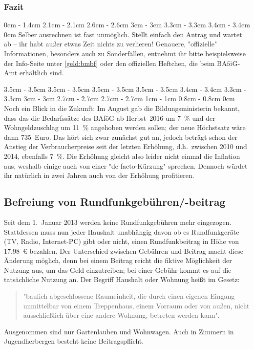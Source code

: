 \begin{multicols*}{2}
\subsubsection*{Fazit}
0cm \columnwidth
0cm \columnwidth
1.4cm \dimexpr\columnwidth - 1.4cm
2.1cm \dimexpr\columnwidth - 2.1cm
2.6cm \dimexpr\columnwidth - 2.6cm
3cm \dimexpr\columnwidth - 3cm
3.3cm \dimexpr\columnwidth - 3.3cm
3.4cm \dimexpr\columnwidth - 3.4cm
0cm \columnwidth
Selber ausrechnen ist fast unmöglich. Stellt einfach den Antrag und wartet ab -- ihr habt außer etwas Zeit nichts zu verlieren! Genauere, "offizielle" Informationen, besonders auch zu Sonderfällen, entnehmt ihr bitte beispielsweise der Info-Seite unter \cref{geld:bmbf} oder den offiziellen Heftchen, die beim BAföG-Amt erhältlich sind.


3.5cm \dimexpr\columnwidth - 3.5cm
3.5cm \dimexpr\columnwidth - 3.5cm
3.5cm \dimexpr\columnwidth - 3.5cm
3.5cm \dimexpr\columnwidth - 3.5cm
3.4cm \dimexpr\columnwidth - 3.4cm
3.3cm \dimexpr\columnwidth - 3.3cm
3cm \dimexpr\columnwidth - 3cm
2.7cm \dimexpr\columnwidth - 2.7cm
2.7cm \dimexpr\columnwidth - 2.7cm
1cm \dimexpr\columnwidth - 1cm
0.8cm \dimexpr\columnwidth - 0.8cm
0cm \columnwidth
Noch ein Blick in die Zukunft: Im August gab die Bildungsministerin bekannt, dass das die Bedarfssätze des BAföG ab Herbst~2016 um \SI{7}{\percent} und der Wohngeldzuschlag um \SI{11}{\percent} angehoben werden sollen; der neue Höchstsatz wäre dann 735~Euro. Das hört sich zwar zunächst gut an, jedoch beträgt schon der Anstieg der Verbraucherpreise seit der letzten Erhöhung, d.h.\ zwischen 2010 und 2014, ebenfalls \SI{7}{\percent}. Die Erhöhung gleicht also leider nicht einmal die Inflation aus, weshalb einige auch von einer "de facto-Kürzung" sprechen. Dennoch würdet ihr natürlich in zwei Jahren auch von der Erhöhung profitieren.

\subsection*{Befreiung von Rundfunkgebühren/-beitrag}
Seit dem 1.~Januar 2013 werden keine Rundfunkgebühren mehr eingezogen. Stattdessen muss nun jeder Haushalt unabhängig davon ob es Rundfunkgeräte (TV, Radio, Internet-PC) gibt oder nicht, einen Rundfunkbeitrag in Höhe von \SI{17,98}{\euro} bezahlen. Der Unterschied zwischen Gebühren und Beitrag macht diese Änderung möglich, denn bei einem Beitrag reicht die fiktive Möglichkeit der Nutzung aus, um das Geld einzutreiben; bei einer Gebühr kommt es auf die tatsächliche Nutzung an. Der Begriff Haushalt oder Wohnung heißt im Gesetz:
\begin{quote}
"baulich abgeschlossene Raumeinheit, die durch einen eigenen Eingang unmittelbar von einem Treppenhaus, einem Vorraum oder von außen, nicht ausschließlich über eine andere Wohnung, betreten werden kann".
\end{quote}
Ausgenommen sind nur Gartenlauben und Wohnwagen. Auch in Zimmern in Jugendherbergen besteht keine Beitragspflicht.


\end{multicols*}
